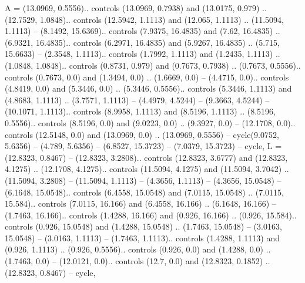 {A} = {(13.0969, 0.5556).. controls (13.0969, 0.7938) and (13.0175, 0.979) .. (12.7529, 1.0848).. controls (12.5942, 1.1113) and (12.065, 1.1113) .. (11.5094, 1.1113) -- (8.1492, 15.6369).. controls (7.9375, 16.4835) and (7.62, 16.4835) .. (6.9321, 16.4835).. controls (6.2971, 16.4835) and (5.9267, 16.4835) .. (5.715, 15.6633) -- (2.3548, 1.1113).. controls (1.7992, 1.1113) and (1.2435, 1.1113) .. (1.0848, 1.0848).. controls (0.8731, 0.979) and (0.7673, 0.7938) .. (0.7673, 0.5556).. controls (0.7673, 0.0) and (1.3494, 0.0) .. (1.6669, 0.0) -- (4.4715, 0.0).. controls (4.8419, 0.0) and (5.3446, 0.0) .. (5.3446, 0.5556).. controls (5.3446, 1.1113) and (4.8683, 1.1113) .. (3.7571, 1.1113) -- (4.4979, 4.5244) -- (9.3663, 4.5244) -- (10.1071, 1.1113).. controls (8.9958, 1.1113) and (8.5196, 1.1113) .. (8.5196, 0.5556).. controls (8.5196, 0.0) and (9.0223, 0.0) .. (9.3927, 0.0) -- (12.1708, 0.0).. controls (12.5148, 0.0) and (13.0969, 0.0) .. (13.0969, 0.5556) -- cycle(9.0752, 5.6356) -- (4.789, 5.6356) -- (6.8527, 15.3723) -- (7.0379, 15.3723) -- cycle},
{L} = {(12.8323, 0.8467) -- (12.8323, 3.2808).. controls (12.8323, 3.6777) and (12.8323, 4.1275) .. (12.1708, 4.1275).. controls (11.5094, 4.1275) and (11.5094, 3.7042) .. (11.5094, 3.2808) -- (11.5094, 1.1113) -- (4.3656, 1.1113) -- (4.3656, 15.0548) -- (6.1648, 15.0548).. controls (6.4558, 15.0548) and (7.0115, 15.0548) .. (7.0115, 15.584).. controls (7.0115, 16.166) and (6.4558, 16.166) .. (6.1648, 16.166) -- (1.7463, 16.166).. controls (1.4288, 16.166) and (0.926, 16.166) .. (0.926, 15.584).. controls (0.926, 15.0548) and (1.4288, 15.0548) .. (1.7463, 15.0548) -- (3.0163, 15.0548) -- (3.0163, 1.1113) -- (1.7463, 1.1113).. controls (1.4288, 1.1113) and (0.926, 1.1113) .. (0.926, 0.5556).. controls (0.926, 0.0) and (1.4288, 0.0) .. (1.7463, 0.0) -- (12.0121, 0.0).. controls (12.7, 0.0) and (12.8323, 0.1852) .. (12.8323, 0.8467) -- cycle},
